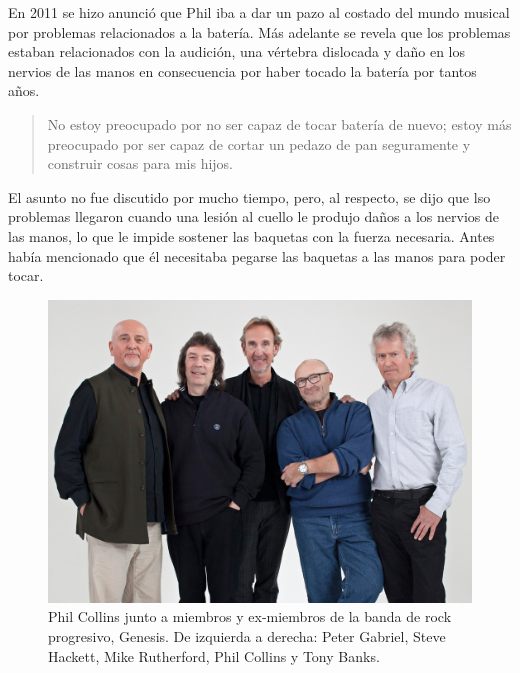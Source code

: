 \documentclass[11pt, oneside]{book}
\begin{document}
  En 2011 se hizo anunció que Phil iba a dar un pazo al costado del mundo musical por problemas relacionados a la batería. Más adelante se revela que los problemas estaban relacionados con la audición, una vértebra dislocada y daño en los nervios de las manos en consecuencia por haber tocado la batería por tantos años.

  \begin{quotation}
    No estoy preocupado por no ser capaz de tocar batería de nuevo; estoy más preocupado por ser capaz de cortar un pedazo de pan seguramente y construir cosas para mis hijos. \cite{enfermo}
  \end{quotation}

  El asunto no fue discutido por mucho tiempo, pero, al respecto, se dijo que lso problemas llegaron cuando una lesión al cuello le produjo daños a los nervios de las manos, lo que le impide sostener las baquetas con la fuerza necesaria. Antes había mencionado que él necesitaba pegarse las baquetas a las manos para poder tocar.

  \begin{figure}
    \begin{center}
      \includegraphics[scale = 0.2]{img/04.jpg}
    \end{center}
    \caption{Phil Collins junto a miembros y ex-miembros de la banda de rock progresivo, Genesis. De izquierda a derecha: Peter Gabriel, Steve Hackett, Mike Rutherford, Phil Collins y Tony Banks.}
  \end{figure}



  
  
\end{document}
